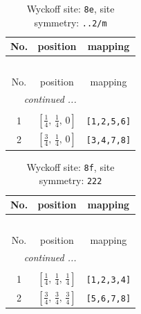 \documentclass[fleqn,8pt]{jsarticle}
\begin{document}
\begin{longtable}{ccc}
\caption{Wyckoff site: {\tt 8e}, site symmetry: {\tt ..2/m}}
 \\
 \hline \hline
No. & position & mapping \\ \hline \endfirsthead

\multicolumn{2}{l}{\tablename\ \thetable{}} \\
 \hline \hline
No. & position & mapping \\ \hline \endhead

 \hline \hline
\multicolumn{2}{r}{\footnotesize\it continued ...} \\ \endfoot

 \hline \hline
\multicolumn{2}{r}{} \\ \endlastfoot

1 & $\left[ \frac{1}{4},\, \frac{1}{4},\, 0 \right]$ & {\tt [1,2,5,6]} \\ \hline
2 & $\left[ \frac{3}{4},\, \frac{1}{4},\, 0 \right]$ & {\tt [3,4,7,8]} \\
\end{longtable}
\renewcommand{\arraystretch}{1.2}
\begin{longtable}{ccc}
\caption{Wyckoff site: {\tt 8f}, site symmetry: {\tt 222}}
 \\
 \hline \hline
No. & position & mapping \\ \hline \endfirsthead

\multicolumn{2}{l}{\tablename\ \thetable{}} \\
 \hline \hline
No. & position & mapping \\ \hline \endhead

 \hline \hline
\multicolumn{2}{r}{\footnotesize\it continued ...} \\ \endfoot

 \hline \hline
\multicolumn{2}{r}{} \\ \endlastfoot

1 & $\left[ \frac{1}{4},\, \frac{1}{4},\, \frac{1}{4} \right]$ & {\tt [1,2,3,4]} \\ \hline
2 & $\left[ \frac{3}{4},\, \frac{3}{4},\, \frac{3}{4} \right]$ & {\tt [5,6,7,8]} \\
\end{longtable}
\renewcommand{\arraystretch}{1.2}
\end{document}

